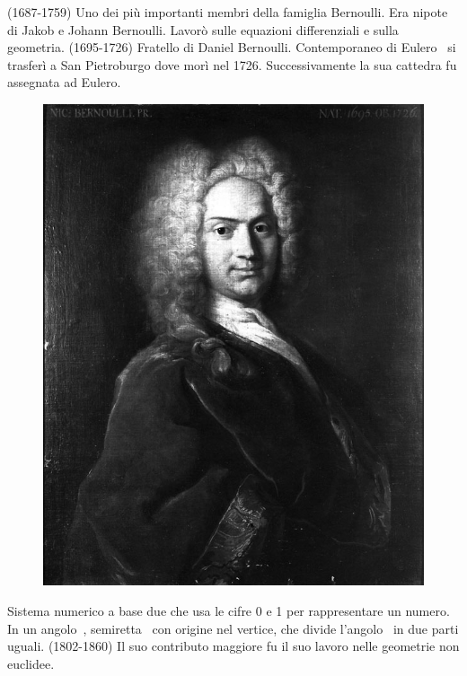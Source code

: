 (1687-1759) Uno dei più importanti membri della famiglia Bernoulli. Era nipote di Jakob e Johann Bernoulli. Lavorò sulle equazioni differenziali e sulla geometria.
 (1695-1726) Fratello di Daniel Bernoulli. Contemporaneo di Eulero\pointsto~ si trasferì a San Pietroburgo dove morì nel 1726. Successivamente la sua cattedra fu assegnata ad Eulero. 
 \cite{Kline1972}
 \begin{figure}
 	\centering	{}
 	\label{fig:bernoullinicolausii}
 	\includegraphics[width=0.7\linewidth]{Figure/B/Bernoulli_Nicolaussecondo}
  \end{figure}
Sistema numerico a base due che usa le cifre \num{0} e \num{1} per rappresentare un numero.
In un angolo\pointsto~, semiretta\pointsto~ con origine nel vertice, che divide l'angolo\pointsto~ in due parti uguali.
(1802-1860) Il suo contributo maggiore fu il suo lavoro nelle geometrie non euclidee.
